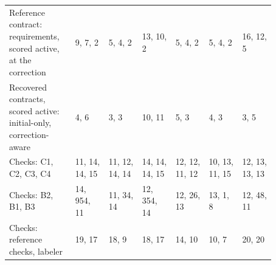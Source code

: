\begin{table}[t]
\begin{tabular}{p{0.2\linewidth}p{0.112\linewidth}p{0.112\linewidth}p{0.112\linewidth}p{0.112\linewidth}p{0.112\linewidth}p{0.112\linewidth}}
\raggedright\hspace{0pt}Reference contract: requirements, scored active, at the correction & \raggedright\hspace{0pt}9, 7, 2 & \raggedright\hspace{0pt}5, 4, 2 & \raggedright\hspace{0pt}13, 10, 2 & \raggedright\hspace{0pt}5, 4, 2 & \raggedright\hspace{0pt}5, 4, 2 & \raggedright\hspace{0pt}16, 12, 5 \tabularnewline
\raggedright\hspace{0pt}Recovered contracts, scored active: initial-only, correction-aware & \raggedright\hspace{0pt}4, 6 & \raggedright\hspace{0pt}3, 3 & \raggedright\hspace{0pt}10, 11 & \raggedright\hspace{0pt}5, 3 & \raggedright\hspace{0pt}4, 3 & \raggedright\hspace{0pt}3, 5 \tabularnewline\midrule
\raggedright\hspace{0pt}Checks: C1, C2, C3, C4 & \raggedright\hspace{0pt}11, 14, 14, 15 & \raggedright\hspace{0pt}11, 12, 14, 14 & \raggedright\hspace{0pt}14, 14, 14, 15 & \raggedright\hspace{0pt}12, 12, 11, 12 & \raggedright\hspace{0pt}10, 13, 11, 15 & \raggedright\hspace{0pt}12, 13, 13, 13 \tabularnewline
\raggedright\hspace{0pt}Checks: B2, B1, B3 & \raggedright\hspace{0pt}14, 954, 11 & \raggedright\hspace{0pt}11, 34, 14 & \raggedright\hspace{0pt}12, 354, 14 & \raggedright\hspace{0pt}12, 26, 13 & \raggedright\hspace{0pt}13, 1, 8 & \raggedright\hspace{0pt}12, 48, 11 \tabularnewline
\raggedright\hspace{0pt}Checks: reference checks, labeler & \raggedright\hspace{0pt}19, 17 & \raggedright\hspace{0pt}18, 9 & \raggedright\hspace{0pt}18, 17 & \raggedright\hspace{0pt}14, 10 & \raggedright\hspace{0pt}10, 7 & \raggedright\hspace{0pt}20, 20 \tabularnewline\midrule

\end{tabular}
\end{table}
